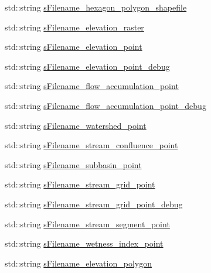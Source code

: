 \begin{DoxyCompactItemize}
\item 
std\-::string \hyperlink{classhexwatershed_1_1domain_a81785372d37e465554213628b5226fb5}{s\-Filename\-\_\-hexagon\-\_\-polygon\-\_\-shapefile}
\item 
std\-::string \hyperlink{classhexwatershed_1_1domain_a014fe1eb4dde81d891c97988220d729d}{s\-Filename\-\_\-elevation\-\_\-raster}
\item 
std\-::string \hyperlink{classhexwatershed_1_1domain_a0ddfbc822faa401aa28669bc111165c7}{s\-Filename\-\_\-elevation\-\_\-point}
\item 
std\-::string \hyperlink{classhexwatershed_1_1domain_a16c36285a4bea563a20d42b68abd52c1}{s\-Filename\-\_\-elevation\-\_\-point\-\_\-debug}
\item 
std\-::string \hyperlink{classhexwatershed_1_1domain_aa1f8aba1cfe66636ca85daf26e1ca72d}{s\-Filename\-\_\-flow\-\_\-accumulation\-\_\-point}
\item 
std\-::string \hyperlink{classhexwatershed_1_1domain_a00f76f9a44e9fbf6f05f9127ac4dce2f}{s\-Filename\-\_\-flow\-\_\-accumulation\-\_\-point\-\_\-debug}
\item 
std\-::string \hyperlink{classhexwatershed_1_1domain_a82aaf8850706fb149e1deaca2a15b377}{s\-Filename\-\_\-watershed\-\_\-point}
\item 
std\-::string \hyperlink{classhexwatershed_1_1domain_a43439d2bf30dd2ef83e233b26229faec}{s\-Filename\-\_\-stream\-\_\-confluence\-\_\-point}
\item 
std\-::string \hyperlink{classhexwatershed_1_1domain_a6e0807e868e43612827691b207f16e28}{s\-Filename\-\_\-subbasin\-\_\-point}
\item 
std\-::string \hyperlink{classhexwatershed_1_1domain_a4fbfd3966c288287e2f4333d527964b0}{s\-Filename\-\_\-stream\-\_\-grid\-\_\-point}
\item 
std\-::string \hyperlink{classhexwatershed_1_1domain_ad4350a3b1ffea69f457256b640d250dd}{s\-Filename\-\_\-stream\-\_\-grid\-\_\-point\-\_\-debug}
\item 
std\-::string \hyperlink{classhexwatershed_1_1domain_a2fb83f796660d12113b5bdf4f497529f}{s\-Filename\-\_\-stream\-\_\-segment\-\_\-point}
\item 
std\-::string \hyperlink{classhexwatershed_1_1domain_a9edbb2f200391123c1d558aae2109001}{s\-Filename\-\_\-wetness\-\_\-index\-\_\-point}
\item 
std\-::string \hyperlink{classhexwatershed_1_1domain_a7e8fe1e18c688c3e5f07fe23dc49c759}{s\-Filename\-\_\-elevation\-\_\-polygon}
\item 

\end{DoxyCompactItemize}
